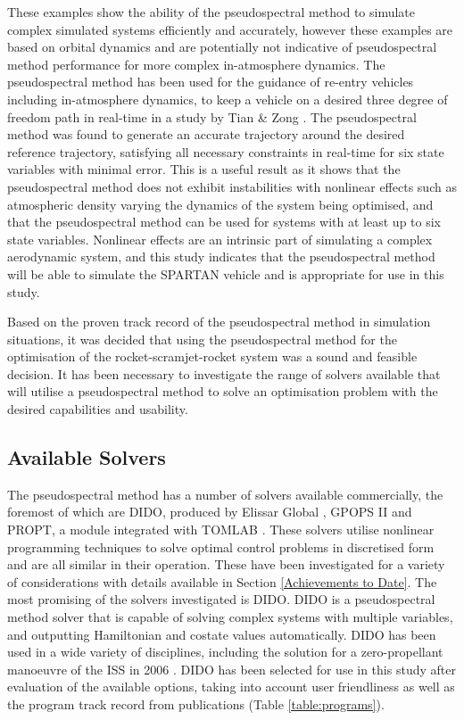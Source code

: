 These examples show the ability of the pseudospectral method to simulate complex simulated systems efficiently and accurately, however these examples are based on orbital dynamics and are potentially not indicative of pseudospectral method performance for more complex in-atmosphere dynamics. The pseudospectral method has been used for the guidance of re-entry vehicles including in-atmosphere dynamics, to keep a vehicle on a desired three degree of freedom path in real-time in a study by Tian \& Zong \cite{Tian2011}. The pseudospectral method was found to generate an accurate trajectory around the desired reference trajectory, satisfying all necessary constraints in real-time for six state variables with minimal error. This is a useful result as it shows that the pseudospectral method does not exhibit instabilities with nonlinear effects such as atmospheric density varying the dynamics of the system being optimised, and that the pseudospectral method can be used for systems with at least up to six state variables. Nonlinear effects are an intrinsic part of simulating a complex aerodynamic system, and this study indicates that the pseudospectral method will be able to simulate the SPARTAN vehicle and is appropriate for use in this study. 

Based on the proven track record of the pseudospectral method in simulation situations, it was decided that using the pseudospectral method for the optimisation of the rocket-scramjet-rocket system was a sound and feasible decision. It has been necessary to investigate the range of solvers available that will utilise a pseudospectral method to solve an optimisation problem with the desired capabilities and usability. 

\subsection{Available Solvers}

The pseudospectral method has a number of solvers available commercially, the foremost of which are DIDO, produced by Elissar Global \cite{Ross2002}, GPOPS II \cite{Rao2010} and PROPT, a module integrated with TOMLAB \cite{Rutquist2010}. These solvers utilise nonlinear programming techniques to solve optimal control problems in discretised form and are all similar in their operation. These have been investigated for a variety of considerations with details available in Section \ref{Achievements to Date}. The most promising of the solvers investigated is DIDO. DIDO is a pseudospectral method solver that is capable of solving complex systems with multiple variables, and outputting Hamiltonian and costate values automatically. DIDO has been used in a wide variety of disciplines, including the solution for a zero-propellant manoeuvre of the ISS in 2006 \cite{Bedrossian}. DIDO has been selected for use in this study after evaluation of the available options, taking into account user friendliness as well as the program track record from publications (Table \ref{table:programs}).

